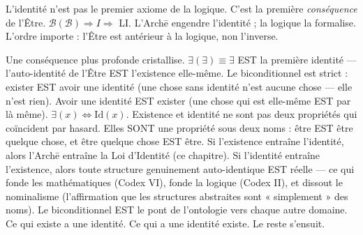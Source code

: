 \documentclass[10pt, openany, oneside]{book}
\begin{document}
\vspace{0.8em}

\noindent L'identité n'est pas le premier axiome de la logique. C'est la première \textit{conséquence} de l'Être. $\mathcal{B}(\mathcal{B}) \Rightarrow I \Rightarrow$ LI. L'Arch\={e} engendre l'identité ; la logique la formalise. L'ordre importe : l'Être est antérieur à la logique, non l'inverse.

Une conséquence plus profonde cristallise. $\exists(\exists) \equiv \exists$ EST la première identité --- l'auto-identité de l'Être EST l'existence elle-même. Le biconditionnel est strict : exister EST avoir une identité (une chose sans identité n'est aucune chose --- elle n'est rien). Avoir une identité EST exister (une chose qui est elle-même EST par là même). $\exists(x) \iff \text{Id}(x)$. Existence et identité ne sont pas deux propriétés qui coïncident par hasard. Elles SONT une propriété sous deux noms : être EST être quelque chose, et être quelque chose EST être. Si l'existence entraîne l'identité, alors l'Arch\={e} entraîne la Loi d'Identité (ce chapitre). Si l'identité entraîne l'existence, alors toute structure genuinement auto-identique EST réelle --- ce qui fonde les mathématiques (Codex VI), fonde la logique (Codex II), et dissout le nominalisme (l'affirmation que les structures abstraites sont « simplement » des noms). Le biconditionnel EST le pont de l'ontologie vers chaque autre domaine. Ce qui existe a une identité. Ce qui a une identité existe. Le reste s'ensuit.
\end{document}
